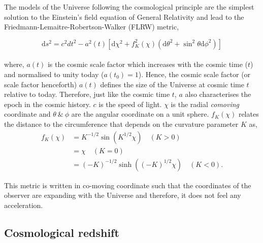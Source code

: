 The models of the Universe following the cosmological principle are the simplest 
solution to the Einstein's field equation of General Relativity and lead to the
Friedmann-Lemaitre-Robertson-Walker (FLRW) metric,

\begin{equation}
	\mathrm{d}s^2 = c^2dt^2 - a^2(t)\left[ \mathrm{d}\chi^2 + f_K^2(\chi)
					\left( \mathrm{d}\theta^2 + \sin^2\theta \mathrm{d}\phi^2 
					\right)  \right]
	\label{eqn:metric}
\end{equation}
\\
where, $a(t)$ is the cosmic scale factor which increases with the cosmic time ($t$)
and normalised to unity today ($a(t_0)=1$). 
Hence, the cosmic scale factor (or scale factor henceforth) $a(t)$ defines the
size of the Universe at cosmic time $t$ relative to today. Therefore, just like 
the cosmic time $t$, $a$ also characterises the epoch in the cosmic history.
$c$ is the speed of light. $\chi$ is the
radial {\it comoving} coordinate and $\theta\ \& \ \phi$ are the angular coordinate on a
unit sphere. $f_K(\chi)$ relates the distance to the circumference that depends 
on the curvature parameter $K$ as,
\begin{equation} \label{eq1}
\begin{split}
f_K(\chi) & = K^{-1/2} \sin(K^{1/2}\chi) \quad (K>0) \\
 & = \chi \quad (K=0) \\
 & = (-K)^{-1/2} \sinh((-K)^{1/2}\chi) \quad (K<0).
\end{split}
\end{equation}

This metric is written in co-moving coordinate such that the coordinates of the
observer are expanding with the Universe and therefore, it does not feel any
acceleration. 



\subsection{Cosmological redshift}

